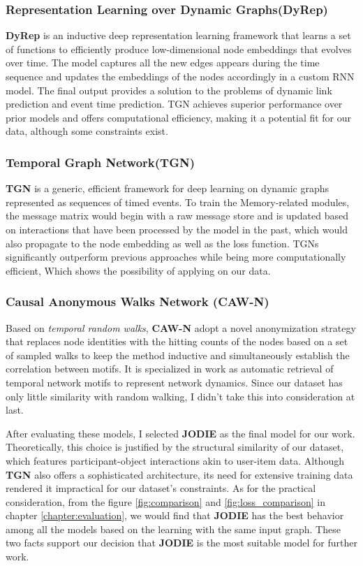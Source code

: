 \subsubsection{Representation Learning over Dynamic Graphs(DyRep)}
\textbf{DyRep}\cite{trivedi2018representation} is an inductive deep representation learning framework that learns a set of functions to efficiently produce low-dimensional node embeddings that evolves over time. The model captures all the new edges appears during the time sequence and updates the embeddings of the nodes accordingly in a custom RNN model. The final output provides a solution to the problems of dynamic link prediction and event time prediction. TGN achieves superior performance over prior models and offers computational efficiency, making it a potential fit for our data, although some constraints exist.


\subsubsection{Temporal Graph Network(TGN)}
\textbf{TGN}\cite{rossi2006temporal} is a generic, efficient framework for deep learning on dynamic graphs represented as sequences of timed events. To train the Memory-related modules, the message matrix would begin with a raw message store and is updated based on interactions that have been processed by the model in the past, which would also propagate to the node embedding as well as the loss function. TGNs significantly outperform previous approaches while being more computationally efficient, Which shows the possibility of applying on our data.

\subsubsection{Causal Anonymous Walks Network (CAW-N)}
Based on \textit{temporal random walks}, \textbf{CAW-N} adopt a novel anonymization strategy that replaces node identities with the hitting counts of the nodes based on a set of sampled walks to keep the method inductive and simultaneously establish the correlation between motifs. It is specialized in work as automatic retrieval of temporal network motifs to represent network dynamics. Since our dataset has only little similarity with random walking, I didn't take this into consideration at last.

After evaluating these models, I selected \textbf{JODIE} as the final model for our work. Theoretically, this choice is justified by the structural similarity of our dataset, which features participant-object interactions akin to user-item data. Although \textbf{TGN } also offers a sophisticated architecture, its need for extensive training data rendered it impractical for our dataset's constraints. As for the practical consideration, from the figure \ref{fig:comparison} and \ref{fig:loss_comparison}  in chapter \ref{chapter:evaluation}, we would find that \textbf{JODIE} has the best behavior among all the models based on the learning with the same input graph. These two facts support our decision that \textbf{JODIE} is the most suitable model for further work.

